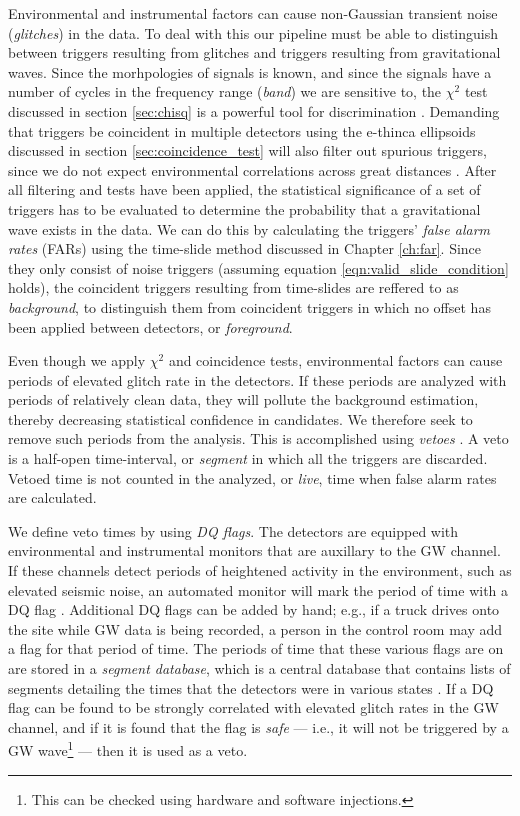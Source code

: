 Environmental and instrumental factors can cause non-Gaussian transient noise
(\emph{glitches}) in the data. To deal with this our pipeline must be able to
distinguish between triggers resulting from glitches and triggers resulting
from gravitational waves. Since the morhpologies of signals is known, and since
 the signals have a number of cycles in the frequency range (\emph{band}) we
are sensitive to, the $\chi^2$ test discussed in section \ref{sec:chisq} is a
powerful tool for discrimination \cite{Allen:2004}. Demanding that triggers be
coincident in multiple detectors using the e-thinca ellipsoids discussed in
section \ref{sec:coincidence_test} will also filter out spurious triggers,
since we do not expect environmental correlations across great distances
\cite{Robinson:2008}. After all filtering and tests have been applied, the
statistical significance of a set of triggers has to be evaluated to determine
the probability that a gravitational wave exists in the data. We can do this by
calculating the triggers' \emph{false alarm rates} (FARs) using the time-slide
method discussed in Chapter \ref{ch:far}. Since they only consist of noise
triggers (assuming equation \ref{eqn:valid_slide_condition} holds), the
coincident triggers resulting from time-slides are reffered to as
\emph{background}, to distinguish them from coincident triggers in which no
offset has been applied between detectors, or \emph{foreground}.

Even though we apply $\chi^2$ and coincidence tests, environmental factors can
cause periods of elevated glitch rate in the detectors. If these periods are
analyzed with periods of relatively clean data, they will pollute the
background estimation, thereby decreasing statistical confidence in candidates.
We therefore seek to remove such periods from the analysis. This is
accomplished using \emph{vetoes} \cite{Slutsky:2010ff, Christensen:2010}. A
veto is a half-open time-interval, or \emph{segment} in which all the triggers
are discarded. Vetoed time is not counted in the analyzed, or \emph{live}, time
when false alarm rates are calculated.

We define veto times by using \emph{\ac{DQ} flags}. The detectors are equipped
with environmental and instrumental monitors that are auxillary to the \ac{GW}
channel. If these channels detect periods of heightened activity in the
environment, such as elevated seismic noise, an automated monitor will mark the
period of time with a \ac{DQ} flag \cite{glitchmon}. Additional \ac{DQ} flags
can be added by hand; e.g., if a truck drives onto the site while \ac{GW} data
is being recorded, a person in the control room may add a flag for that period
of time.  The periods of time that these various flags are on are stored in a
\emph{segment database}, which is a central database that contains lists of
segments detailing the times that the detectors were in various states
\cite{BPP:segdb}. If a \ac{DQ} flag can be found to be strongly
correlated with elevated glitch rates in the \ac{GW} channel, and if it is
found that the flag is \emph{safe} --- i.e., it will not be triggered by a
\ac{GW} wave\footnote{This can be checked using hardware and software
injections.} --- then it is used as a veto. 

